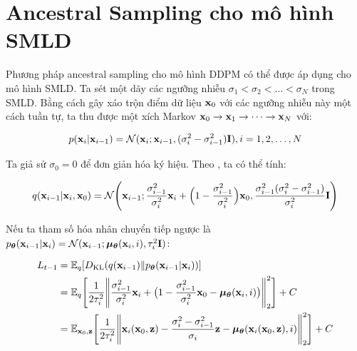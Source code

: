 \documentclass{article} %
\begin{document}
\section{Ancestral Sampling cho mô hình SMLD}

Phương pháp ancestral sampling cho mô hình DDPM có thể được áp dụng cho mô hình SMLD.
Ta sét một dãy các ngưỡng nhiễu $\sigma_1 < \sigma_2 < \dots < \sigma_N$ trong SMLD.
Bằng cách gây xáo trộn điểm dữ liệu $\bold{x}_0$ với các ngưỡng nhiễu này một cách tuần tự, ta thu được một xích Markov $\bold{x}_0 \rightarrow \bold{x}_1 \rightarrow \dots \rightarrow \bold{x}_N$ với:

\begin{equation*}
    p(\bold{x}_i \vert \bold{x}_{i-1}) = \mathcal{N}(\bold{x}_i; \bold{x}_{i-1}, (\sigma_i^2 - \sigma_{i-1}^2) \bold{I}), i = 1, 2, \dots, N
\end{equation*}

Ta giả sử $\sigma_0 = 0$ để đơn giản hóa ký hiệu.
Theo \citep{ho2020denoising}, ta có thể tính:

\begin{equation*}
    q(\bold{x}_{i-1} \vert \bold{x}_i, \bold{x}_0) = \mathcal{N} \Bigg( \bold{x}_{i-1}; \dfrac{\sigma_{i-1}^2}{\sigma_i^2} \bold{x}_i + \Big( 1 - \dfrac{\sigma_{i-1}^2}{\sigma_i^2} \Big) \bold{x}_0, \dfrac{\sigma_{i-1}^2 (\sigma_i^2 - \sigma_{i-1}^2)}{\sigma_i^2} \bold{I} \Bigg)
\end{equation*}

Nếu ta tham số hóa nhân chuyển tiếp ngược là $p_{\boldsymbol{\theta}}(\bold{x}_{i-1} \vert \bold{x}_i)=\mathcal{N}(\bold{x}_{i-1}; \boldsymbol{\mu}_{\boldsymbol{\theta}}(\bold{x}_i, i), \tau_i^2 \bold{I})$:

\begin{equation*}
    \begin{aligned}
        L_{t-1} &= \mathbb{E}_q \lbrack D_{\mathrm{KL}}(q(\bold{x}_{i-1}) \Vert p_{\boldsymbol{\theta}}(\bold{x}_{i-1} \vert \bold{x}_i)) \rbrack \\
        &= \mathbb{E}_q \Bigg \lbrack \dfrac{1}{2 \tau_i^2} \Bigg \lVert \dfrac{\sigma_{i-1}^2}{\sigma_i^2} \bold{x}_i + \big(1 - \dfrac{\sigma_{i-1}^2}{\sigma_i^2} \bold{x}_0 - \boldsymbol{\mu}_{\boldsymbol{\theta}} (\bold{x}_i, i) \big) \Bigg \rVert_2^2 \Bigg \rbrack + C \\
        &= \mathbb{E}_{\bold{x}_0, \bold{z}} \Bigg \lbrack \dfrac{1}{2 \tau_i^2} \Bigg \lVert \bold{x}_i(\bold{x}_0, \bold{z}) - \dfrac{\sigma_i^2 - \sigma_{i-1}^2}{\sigma_i} \bold{z} - \boldsymbol{\mu}_{\boldsymbol{\theta}} (\bold{x}_i (\bold{x}_0, \bold{z}), i) \Bigg \rVert_2^2 \Bigg \rbrack + C
    \end{aligned}
\end{equation*}
\end{document}

